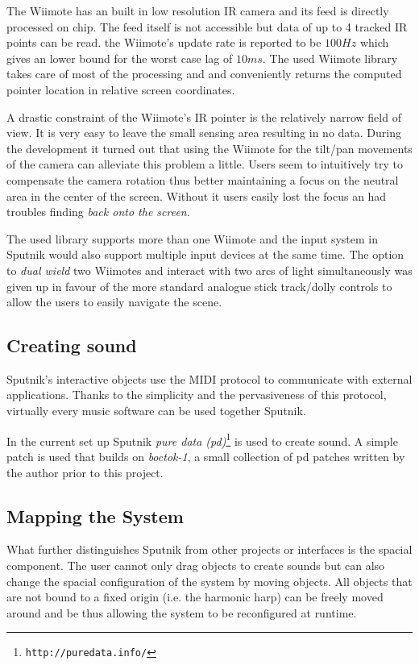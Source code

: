 \documentclass[10pt,a4paper]{scrartcl}
\begin{document}
The Wiimote has an built in low resolution IR camera and its feed is directly processed on chip. The feed itself is not accessible but data of up to 4 tracked IR points can be read. the Wiimote's update rate is reported to be $100Hz$ which gives an lower bound for the worst case lag of $10ms$. The used Wiimote library takes care of most of the processing and and conveniently returns the computed pointer location in relative screen coordinates.

A drastic constraint of the Wiimote's IR pointer is the relatively narrow field of view. It is very easy to leave the small sensing area resulting in no data. During the development it turned out that using the Wiimote for the tilt/pan movements of the camera can alleviate this problem a little. Users seem to intuitively try to compensate the camera rotation thus better maintaining a focus on the neutral area in the center of the screen. Without it users easily lost the focus an had troubles finding \emph{back onto the screen}.

The used library supports more than one Wiimote and the input system in Sputnik would also support multiple input devices at the same time. The option to \emph{dual wield} two Wiimotes and interact with two arcs of light simultaneously was given up in favour of the more standard analogue stick track/dolly controls to allow the users to easily navigate the scene. 





\subsection{Creating sound}
Sputnik's interactive objects use the MIDI  protocol to communicate with external applications. Thanks to the simplicity and the pervasiveness of this protocol, virtually every music software can be used together Sputnik. 

In the current set up Sputnik \emph{pure data (pd)}\footnote{\texttt{http://puredata.info/}} is used to create sound. A simple patch is used that builds on \emph{boctok-1}, a small collection of pd patches written by the author prior to this project. 





\subsection{Mapping the System}
What further distinguishes Sputnik from other projects or interfaces is the spacial component. The user cannot only drag objects to create sounds but can also change the spacial configuration of the system by moving objects. All objects that are not bound to a fixed origin (i.e. the harmonic harp) can be freely moved around and be thus allowing the system to be reconfigured at runtime. 
\end{document}
